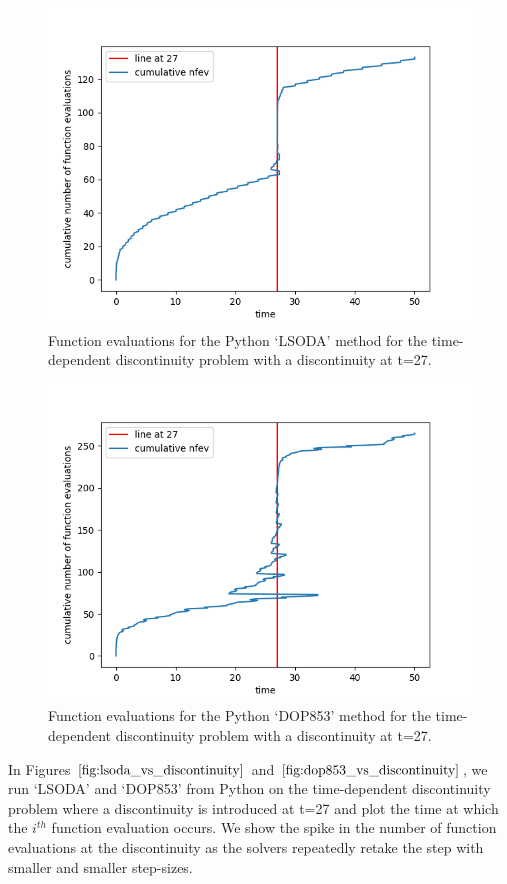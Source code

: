 \begin{figure}[h]
\centering
\includegraphics[width=0.7\linewidth]{./figures/lsoda_vs_discontinuity}
\caption{Function evaluations for the Python `LSODA' method for the time-dependent discontinuity problem with a discontinuity at t=27.}
\label{fig:lsoda_vs_discontinuity}
\end{figure}

\begin{figure}[h]
\centering
\includegraphics[width=0.7\linewidth]{./figures/dop853_vs_discontinuity}
\caption{Function evaluations for the Python `DOP853' method for the time-dependent discontinuity problem with a discontinuity at t=27.}
\label{fig:dop853_vs_discontinuity}
\end{figure}

In Figures $\ref{fig:lsoda_vs_discontinuity}$ and $\ref{fig:dop853_vs_discontinuity}$, we run `LSODA' and `DOP853' from Python on the time-dependent discontinuity problem where a discontinuity is introduced at t=27 and plot the time at which the $i^{th}$ function evaluation occurs. We show the spike in the number of function evaluations at the discontinuity as the solvers repeatedly retake the step with smaller and smaller step-sizes.

